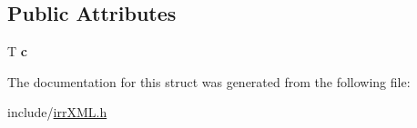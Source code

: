 \subsection*{Public Attributes}
\begin{DoxyCompactItemize}
\item 
T {\bfseries c}\hypertarget{structirr_1_1io_1_1xmlChar_a1d4bf8ca9981f09e1390798cde13262c}{}\label{structirr_1_1io_1_1xmlChar_a1d4bf8ca9981f09e1390798cde13262c}

\end{DoxyCompactItemize}


The documentation for this struct was generated from the following file\+:\begin{DoxyCompactItemize}
\item 
include/\hyperlink{irrXML_8h}{irr\+X\+M\+L.\+h}\end{DoxyCompactItemize}
